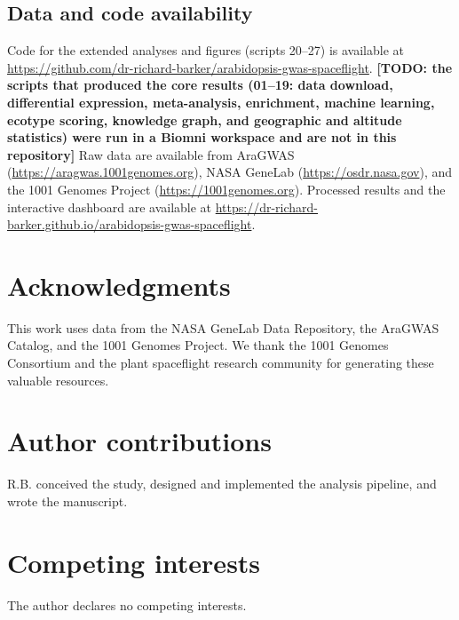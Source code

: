 \documentclass[sn-mathphys-num,Basic]{sn-jnl}
\begin{document}

\subsection{Data and code availability}

Code for the extended analyses and figures (scripts 20--27) is available at \url{https://github.com/dr-richard-barker/arabidopsis-gwas-spaceflight}. \textbf{[TODO: the scripts that produced the core results (01--19: data download, differential expression, meta-analysis, enrichment, machine learning, ecotype scoring, knowledge graph, and geographic and altitude statistics) were run in a Biomni workspace and are not in this repository]} Raw data are available from AraGWAS (\url{https://aragwas.1001genomes.org}), NASA GeneLab (\url{https://osdr.nasa.gov}), and the 1001 Genomes Project (\url{https://1001genomes.org}). Processed results and the interactive dashboard are available at \url{https://dr-richard-barker.github.io/arabidopsis-gwas-spaceflight}.

\section*{Acknowledgments}

This work uses data from the NASA GeneLab Data Repository, the AraGWAS Catalog, and the 1001 Genomes Project. We thank the 1001 Genomes Consortium and the plant spaceflight research community for generating these valuable resources.

\section*{Author contributions}

R.B. conceived the study, designed and implemented the analysis pipeline, and wrote the manuscript.

\section*{Competing interests}

The author declares no competing interests.



\end{document}
